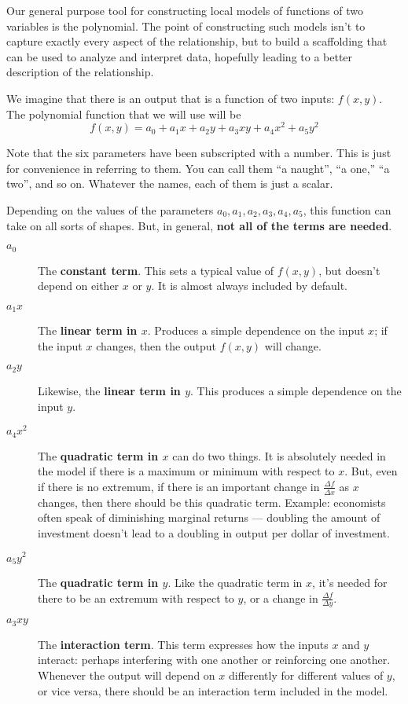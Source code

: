 Our general purpose tool for constructing local models of functions of two 
variables is the polynomial.  The point of constructing such models
isn't to capture exactly every aspect of the relationship, but to
build a scaffolding that can be used to analyze and interpret data,
hopefully leading to a better description of the relationship.

We imagine that there is an output that is a function of two inputs:
$f(x,y)$.  The polynomial function that we will use will be
$$ f(x,y) = a_0 + a_1 x + a_2 y + a_3 x y + a_4 x^2 + a_5 y^2$$

Note that the six parameters have been subscripted with a number.  This is just for
convenience in referring to them.  You can call them ``a naught'', ``a
one,'' ``a two'', and so on.  Whatever the names, each of them is just
a scalar.

Depending on the values of the parameters $a_0, a_1, a_2, a_3, a_4,
a_5$, this function can take on all sorts of shapes.  But, in general,
{\bf not all of the terms are needed}.



\begin{description}

\item[$a_0$] The {\bf constant term}.  This sets a typical value of
  $f(x,y)$, but doesn't depend on either $x$ or $y$.  It is almost
  always included by default.


\item[$a_1 x$] The {\bf linear term in $x$}. 
  Produces a simple dependence on the input $x$; if the
  input $x$  changes, then the output $f(x,y)$ will change.

\item[$a_2 y$] Likewise, the {\bf linear term in $y$}. This produces a simple dependence on the input $y$.

\item[$a_4 x^2$] The {\bf quadratic term in $x$} can do two things.  It is
  absolutely needed in the model if there is a maximum or minimum with
  respect to $x$.  But, even if there is no extremum, if there is an
  important change in $\frac{\Delta f}{\Delta x}$ as $x$ changes, then
  there should be this quadratic term.  Example: economists often
  speak of diminishing marginal returns --- doubling the amount of
  investment doesn't lead to a doubling in output per dollar of
  investment.

\item[$a_5 y^2$] The {\bf quadratic term in $y$}. Like the quadratic term in $x$, it's needed for there to be an extremum with
  respect to $y$, or a change in $\frac{\Delta f}{\Delta y}$.

\item[$a_3 x y $] The {\bf interaction term}.  This term expresses how the
  inputs $x$ and $y$ interact: perhaps interfering with one another or
  reinforcing one another.  Whenever the output will depend on $x$
  differently for different values of $y$, or vice versa, there should
  be an interaction term included in the model.  

\end{description} 


